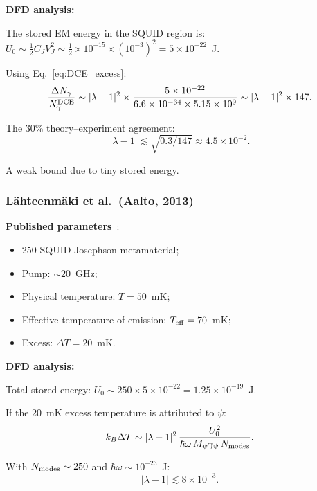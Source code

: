 \documentclass[12pt,aps,prd,twocolumn,superscriptaddress,nofootinbib]{revtex4-2}
\newcommand{\gpsi}{\gamma_\psi}
\newcommand{\Mpsi}{M_\psi}
\newcommand{\half}{\tfrac{1}{2}}
\begin{document}
\textbf{DFD analysis:}

The stored EM energy in the SQUID region is:
$U_0 \sim \half C_J V_J^2 \sim \half\times10^{-15}\times(10^{-3})^2
= 5\times10^{-22}$~J.

Using Eq.~\eqref{eq:DCE_excess}:
\begin{equation}
\frac{\Delta N_\gamma}{N_\gamma^{\rm DCE}}
\sim |\lambda-1|^2\times\frac{5\times10^{-22}}
{6.6\times10^{-34}\times5.15\times10^9}
\sim |\lambda-1|^2\times147.
\label{eq:wilson_calc}
\end{equation}

The 30\% theory--experiment agreement:
\begin{equation}
|\lambda-1| \lesssim \sqrt{0.3/147} \approx 4.5\times10^{-2}.
\label{eq:wilson_bound}
\end{equation}

A weak bound due to tiny stored energy.

\subsubsection{L\"ahteenm\"aki et al.\ (Aalto, 2013)}
\label{sec:lahteenmaki}

\textbf{Published parameters}~\cite{Lahteenmaki2013}:
\begin{itemize}[noitemsep]
\item 250-SQUID Josephson metamaterial;
\item Pump: $\sim20$~GHz;
\item Physical temperature: $T = 50$~mK;
\item Effective temperature of emission: $T_{\rm eff} = 70$~mK;
\item Excess: $\Delta T = 20$~mK.
\end{itemize}

\textbf{DFD analysis:}

Total stored energy: $U_0 \sim 250\times5\times10^{-22}
= 1.25\times10^{-19}$~J.

If the 20~mK excess temperature is attributed to $\psi$:
\begin{equation}
k_B\Delta T \sim |\lambda-1|^2\,\frac{U_0^2}
{\hbar\omega\,\Mpsi\gpsi\,N_{\rm modes}}.
\label{eq:lahteenmaki_calc}
\end{equation}

With $N_{\rm modes} \sim 250$ and $\hbar\omega \sim 10^{-23}$~J:
\begin{equation}
|\lambda-1| \lesssim 8\times10^{-3}.
\label{eq:lahteenmaki_bound}
\end{equation}
\end{document}
